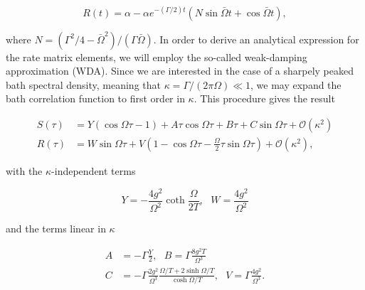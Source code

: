 \documentclass[preprint]{revtex4-2}
\begin{document}
\begin{equation}
    R(t) = \alpha - \alpha e^{-(\Gamma/2)t}(N\sin\bar{\Omega}t+\cos\bar{\Omega}t),
\end{equation}

where $N=(\Gamma^2/4-\bar{\Omega}^2)/(\Gamma\bar{\Omega})$.
In order to derive an analytical expression for the rate matrix elements, we will employ the so-called 
weak-damping approximation (WDA). Since we are interested in the case of a sharpely peaked bath spectral density,
meaning that $\kappa = \Gamma/(2\pi\Omega) \ll 1$, we may expand the bath correlation function to first order
in $\kappa$. This procedure gives the result 

\begin{align}
    S(\tau) &= Y (\cos\Omega\tau-1) + A\tau\cos\Omega\tau + B\tau + C\sin\Omega\tau + \mathcal{O}(\kappa^2) \\
    R(\tau) &= W\sin\Omega\tau + V \left( 1 - \cos\Omega\tau - \frac{\Omega}{2}\tau\sin\Omega\tau \right) + \mathcal{O}(\kappa^2),
\end{align}

with the $\kappa$-independent terms 

\begin{equation}
    Y = - \frac{4g^2}{\Omega^2}\coth\frac{\Omega}{2T}, \ \ \ W = \frac{4g^2}{\Omega^2}
\end{equation}

and the terms linear in $\kappa$

\begin{align}
    A &= -\Gamma \frac{Y}{2}, \ \ \ B = \Gamma\frac{8g^2T}{\Omega^3} \\
    C &= -\Gamma \frac{2g^2}{\Omega^3}\frac{\Omega/T+2\sinh\Omega/T}{\cosh\Omega/T}, \ \ \ V = \Gamma \frac{4g^2}{\Omega^3}.
\end{align}
\end{document}
